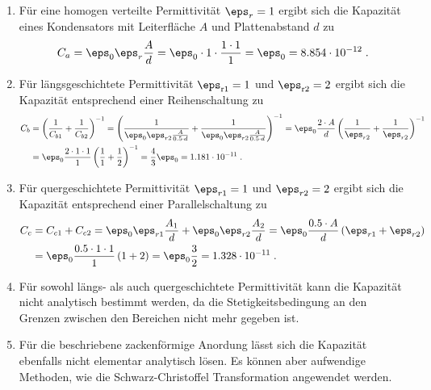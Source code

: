 \documentclass[./Protokollheft.tex]{subfiles}
\begin{document}
\begin{enumerate}[label=\alph*)]

\item  Für eine homogen verteilte Permittivität $\eps_r=1$ ergibt sich die Kapazität eines Kondensators mit Leiterfläche $A$ und Plattenabstand $d$ zu
\begin{align}
C_a = \eps_0\eps_r \frac{A}{d} = \eps_0\cdot 1\cdot\frac{1\cdot 1}{1} = \eps_0 = 8.854 \cdot 10^{-12}\; .
\end{align}

\item  Für längsgeschichtete Permittivität $\eps_{\text{r}1}=1$ und $\eps_{\text{r}2}=2$  ergibt sich die Kapazität entsprechend einer Reihenschaltung zu
\begin{align}
\begin{split}
C_b
&= 
\left(\frac{1}{C_{b1}} + \frac{1}{C_{b2}} \right)^{-1}
=
\left(
\frac{1}{\eps_0\eps_{r2} \frac{A}{0.5\cdot d}}
+
\frac{1}{\eps_0\eps_{r2} \frac{A}{0.5\cdot d}}
\right)^{-1}
=
\eps_0 \frac{2\cdot A}{d}
\left(
\frac{1}{\eps_{r2}}
+
\frac{1}{\eps_{r2}}
\right)^{-1} \\
&=
\eps_0 \frac{2\cdot 1\cdot 1}{1}
\left(
\frac{1}{1}
+
\frac{1}{2}
\right)^{-1}
=
\frac{4}{3}\eps_0
= 1.181 \cdot 10^{-11} \; .
\end{split} 
\end{align}
 
\item Für quergeschichtete Permittivität $\eps_{r1} = 1$ und $\eps_{r2} = 2$ ergibt sich die Kapazität entsprechend einer Parallelschaltung zu 
\begin{align}
	C_c &= C_{c1} + C_{c2}
	= \eps_0 \eps_{r1} \frac{A_1}{d} + \eps_0 \eps_{r2} \frac{A_2}{d}
	= \eps_0 \frac{0.5 \cdot A}{d} \left( \eps_{r1} + \eps_{r2} \right) 
	\\
	&= \eps_0 \frac{0.5 \cdot 1 \cdot 1}{1} \left( 1 + 2 \right)
	= \eps_0 \frac{3}{2}
	= 1.328 \cdot 10^{-11} \; .
\end{align}

\item  Für sowohl längs- als auch quergeschichtete Permittivität kann die Kapazität nicht analytisch bestimmt werden, da die Stetigkeitsbedingung an den Grenzen zwischen den Bereichen nicht mehr gegeben ist. 

\item  Für die beschriebene zackenförmige Anordung lässt sich die Kapazität ebenfalls nicht elementar analytisch lösen. Es können aber aufwendige Methoden, wie die Schwarz-Christoffel Transformation angewendet werden.

\end{enumerate}
\end{document}

